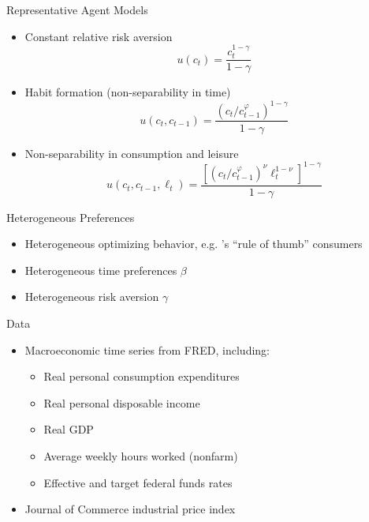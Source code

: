 \documentclass{beamer}
\begin{document}
\begin{frame}{Representative Agent Models}
\begin{itemize}
\item Constant relative risk aversion
$$u(c_t) = \frac{c_t^{1-\gamma}}{1-\gamma}$$
\item Habit formation (non-separability in time)
$$u(c_t, c_{t-1}) = \frac{(c_t/c_{t-1}^\varphi)^{1-\gamma}}{1-\gamma}$$
\item Non-separability in consumption and leisure $$u(c_t, c_{t-1}, \ell_t) = \frac{\left[(c_t/c_{t-1}^\varphi)^\nu \ell_t^{1-\nu}\right]^{1-\gamma}}{1-\gamma}$$
\end{itemize}
\end{frame}

\begin{frame}{Heterogeneous Preferences}
\begin{itemize}
\item Heterogeneous optimizing behavior, e.g. \cite{campbell89}'s ``rule of thumb'' consumers
\item Heterogeneous time preferences $\beta$
\item Heterogeneous risk aversion $\gamma$
\end{itemize}
\end{frame}

\begin{frame}{Data}
\begin{itemize}
\item Macroeconomic time series from FRED, including:
    \begin{itemize}
    \item Real personal consumption expenditures
    \item Real personal disposable income
    \item Real GDP
    \item Average weekly hours worked (nonfarm)
    \item Effective and target federal funds rates
    \end{itemize}
\item Journal of Commerce industrial price index
\end{itemize}
\end{frame}
\end{document}

